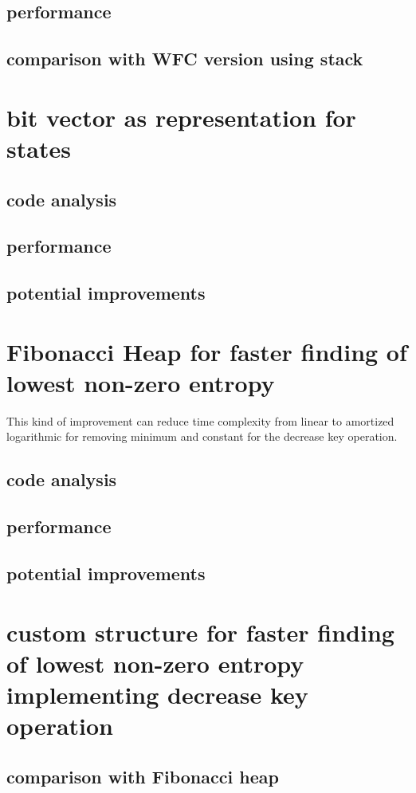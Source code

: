 \documentclass[shortabstract, english, inz]{iithesis}
\begin{document}
        \subsection{performance}
        \subsection{comparison with WFC version using stack}
        \label{stack_vs_queue}
    \section{bit vector as representation for states}
        \label{bitwise}
        \subsection{code analysis}
        \subsection{performance}
        \subsection{potential improvements}
    \section{Fibonacci Heap for faster finding of lowest non-zero entropy}
    \label{fibheap}
    This kind of improvement can reduce time complexity from linear to amortized logarithmic for removing minimum and constant for the decrease key operation.
        \subsection{code analysis}
        \subsection{performance}
        \subsection{potential improvements}
    \section{custom structure for faster finding of lowest non-zero entropy implementing decrease key operation}
    \label{prioritybuckets}
        \subsection{comparison with Fibonacci heap}
\end{document}
